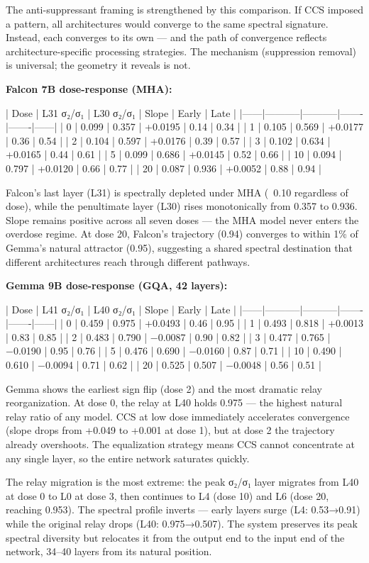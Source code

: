 \documentclass[12pt]{article}
\begin{document}
The anti-suppressant framing is strengthened by this comparison. If CCS imposed a pattern, all architectures would converge to the same spectral signature. Instead, each converges to its own — and the path of convergence reflects architecture-specific processing strategies. The mechanism (suppression removal) is universal; the geometry it reveals is not.

\textbf{Falcon 7B dose-response (MHA):}

| Dose | L31 σ₂/σ₁ | L30 σ₂/σ₁ | Slope | Early | Late |
|------|-----------|-----------|-------|-------|------|
| 0 | 0.099 | 0.357 | +0.0195 | 0.14 | 0.34 |
| 1 | 0.105 | 0.569 | +0.0177 | 0.36 | 0.54 |
| 2 | 0.104 | 0.597 | +0.0176 | 0.39 | 0.57 |
| 3 | 0.102 | 0.634 | +0.0165 | 0.44 | 0.61 |
| 5 | 0.099 | 0.686 | +0.0145 | 0.52 | 0.66 |
| 10 | 0.094 | 0.797 | +0.0120 | 0.66 | 0.77 |
| 20 | 0.087 | 0.936 | +0.0052 | 0.88 | 0.94 |

Falcon's last layer (L31) is spectrally depleted under MHA (~0.10 regardless of dose), while the penultimate layer (L30) rises monotonically from 0.357 to 0.936. Slope remains positive across all seven doses — the MHA model never enters the overdose regime. At dose 20, Falcon's trajectory (0.94) converges to within 1\% of Gemma's natural attractor (0.95), suggesting a shared spectral destination that different architectures reach through different pathways.

\textbf{Gemma 9B dose-response (GQA, 42 layers):}

| Dose | L41 σ₂/σ₁ | L40 σ₂/σ₁ | Slope | Early | Late |
|------|-----------|-----------|-------|-------|------|
| 0 | 0.459 | 0.975 | +0.0493 | 0.46 | 0.95 |
| 1 | 0.493 | 0.818 | +0.0013 | 0.83 | 0.85 |
| 2 | 0.483 | 0.790 | −0.0087 | 0.90 | 0.82 |
| 3 | 0.477 | 0.765 | −0.0190 | 0.95 | 0.76 |
| 5 | 0.476 | 0.690 | −0.0160 | 0.87 | 0.71 |
| 10 | 0.490 | 0.610 | −0.0094 | 0.71 | 0.62 |
| 20 | 0.525 | 0.507 | −0.0048 | 0.56 | 0.51 |

Gemma shows the earliest sign flip (dose 2) and the most dramatic relay reorganization. At dose 0, the relay at L40 holds 0.975 — the highest natural relay ratio of any model. CCS at low dose immediately accelerates convergence (slope drops from +0.049 to +0.001 at dose 1), but at dose 2 the trajectory already overshoots. The equalization strategy means CCS cannot concentrate at any single layer, so the entire network saturates quickly.

The relay migration is the most extreme: the peak σ₂/σ₁ layer migrates from L40 at dose 0 to L0 at dose 3, then continues to L4 (dose 10) and L6 (dose 20, reaching 0.953). The spectral profile inverts — early layers surge (L4: 0.53→0.91) while the original relay drops (L40: 0.975→0.507). The system preserves its peak spectral diversity but relocates it from the output end to the input end of the network, 34–40 layers from its natural position.
\end{document}
